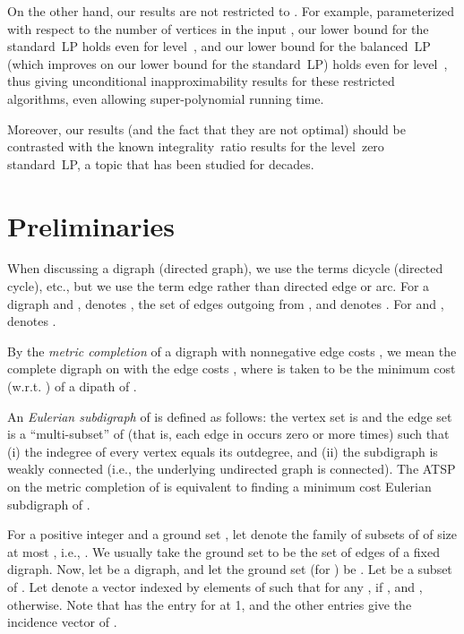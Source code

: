 \documentclass[11pt]{article}
\begin{document}
On the other hand,  our results are not restricted to .
For example, parameterized with respect to the number of vertices in
the input , our lower bound for the standard~LP holds even for
level~, and our lower bound for the balanced~LP
(which improves on our lower bound for the standard~LP)
holds even for level~, thus giving
unconditional inapproximability results for these restricted
algorithms, even allowing super-polynomial running time.

Moreover, our results (and the fact that they are not optimal)
should be contrasted with the
known integrality~ratio results for the level~zero standard~LP,
a topic that has been studied for decades.














\section{Preliminaries}

When discussing a digraph (directed graph), we
use the terms dicycle (directed cycle), etc.,
but we use the term edge rather than directed edge or arc.
For a digraph  and ,
 denotes ,
the set of edges outgoing from ,
and  denotes .
For  and ,
 denotes .

By the \textit{metric completion} of a
digraph  with nonnegative edge costs ,
we mean the complete digraph  on 
with the edge costs ,
where  is taken to be the minimum cost (w.r.t. )
of a  dipath of .


An \textit{Eulerian subdigraph} of  is defined as follows:
the vertex set is 
and the edge set is a ``multi-subset'' of 
(that is, each edge in  occurs zero or more times)
such that (i) the indegree of every vertex equals its outdegree, and
(ii) the subdigraph is weakly connected (i.e., the underlying
undirected graph is connected). The ATSP on the metric completion 
of  is equivalent to finding a minimum cost Eulerian subdigraph of
.


For a positive integer  and a ground set , let  denote the
family of subsets of  of size at most , i.e.,
.
We usually take the ground set to be the set of edges of a fixed digraph.
Now, let  be a digraph, and
let the ground set (for ) be .
Let  be a subset of .
Let  denote a vector indexed by elements of 
such that for any ,  if ,
and , otherwise.
Note that  has the entry for  at 1,
and the other entries give the incidence vector of .
\end{document}
